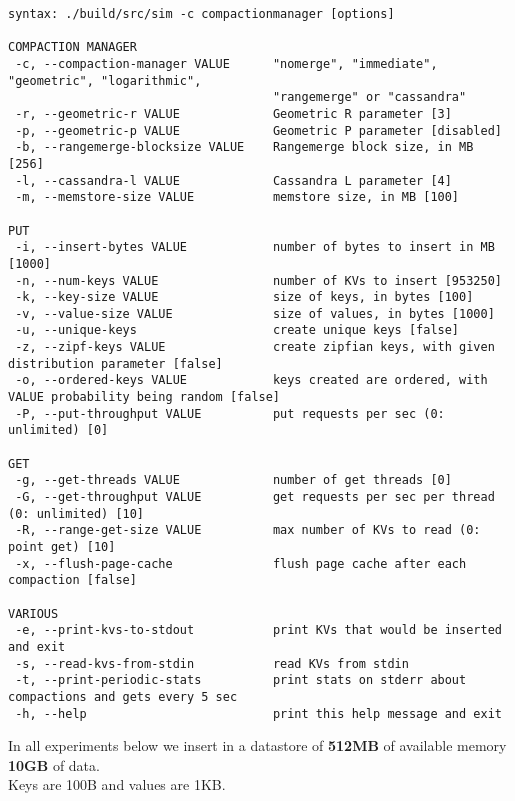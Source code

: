 \documentclass[11pt]{article}
\begin{document}
\footnotesize
\begin{verbatim}
syntax: ./build/src/sim -c compactionmanager [options]

COMPACTION MANAGER
 -c, --compaction-manager VALUE      "nomerge", "immediate", "geometric", "logarithmic",
                                     "rangemerge" or "cassandra"
 -r, --geometric-r VALUE             Geometric R parameter [3]
 -p, --geometric-p VALUE             Geometric P parameter [disabled]
 -b, --rangemerge-blocksize VALUE    Rangemerge block size, in MB [256]
 -l, --cassandra-l VALUE             Cassandra L parameter [4]
 -m, --memstore-size VALUE           memstore size, in MB [100]

PUT
 -i, --insert-bytes VALUE            number of bytes to insert in MB [1000]
 -n, --num-keys VALUE                number of KVs to insert [953250]
 -k, --key-size VALUE                size of keys, in bytes [100]
 -v, --value-size VALUE              size of values, in bytes [1000]
 -u, --unique-keys                   create unique keys [false]
 -z, --zipf-keys VALUE               create zipfian keys, with given distribution parameter [false]
 -o, --ordered-keys VALUE            keys created are ordered, with VALUE probability being random [false]
 -P, --put-throughput VALUE          put requests per sec (0: unlimited) [0]

GET
 -g, --get-threads VALUE             number of get threads [0]
 -G, --get-throughput VALUE          get requests per sec per thread (0: unlimited) [10]
 -R, --range-get-size VALUE          max number of KVs to read (0: point get) [10]
 -x, --flush-page-cache              flush page cache after each compaction [false]

VARIOUS
 -e, --print-kvs-to-stdout           print KVs that would be inserted and exit
 -s, --read-kvs-from-stdin           read KVs from stdin
 -t, --print-periodic-stats          print stats on stderr about compactions and gets every 5 sec
 -h, --help                          print this help message and exit
\end{verbatim}

In all experiments below we insert in a datastore of \textbf{512MB} of available
memory \textbf{10GB} of data. \\
Keys are 100B and values are 1KB.

\clearpage

\end{document}
